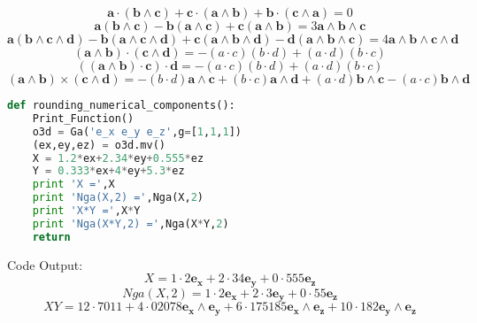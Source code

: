 \documentclass[10pt,fleqn]{report}
\newcommand{\W}{\wedge}
\begin{document}
\begin{equation*} \bm{a\cdot (b\W c)+c\cdot (a\W b)+b\cdot (c\W a)} = 0 \end{equation*}
\begin{equation*} \bm{a (b\W c)-b (a\W c)+c (a\W b)} = 3 \boldsymbol{a\wedge b\wedge c} \end{equation*}
\begin{equation*} \bm{a (b\W c\W d)-b (a\W c\W d)+c (a\W b\W d)-d (a\W b\W c)} = 4 \boldsymbol{a\wedge b\wedge c\wedge d} \end{equation*}
\begin{equation*} \bm{(a\W b)\cdot (c\W d)} = - \left ( a\cdot c\right )  \left ( b\cdot d\right )  + \left ( a\cdot d\right )  \left ( b\cdot c\right ) \end{equation*}
\begin{equation*} \bm{((a\W b)\cdot c)\cdot d} = - \left ( a\cdot c\right )  \left ( b\cdot d\right )  + \left ( a\cdot d\right )  \left ( b\cdot c\right ) \end{equation*}
\begin{equation*} \bm{(a\W b)\times (c\W d)} = - \left ( b\cdot d\right )  \boldsymbol{a\wedge c} + \left ( b\cdot c\right )  \boldsymbol{a\wedge d} + \left ( a\cdot d\right )  \boldsymbol{b\wedge c} - \left ( a\cdot c\right )  \boldsymbol{b\wedge d} \end{equation*}
\begin{lstlisting}[language=Python,showspaces=false,showstringspaces=false,backgroundcolor=\color{gray},frame=single]
def rounding_numerical_components():
    Print_Function()
    o3d = Ga('e_x e_y e_z',g=[1,1,1])
    (ex,ey,ez) = o3d.mv()
    X = 1.2*ex+2.34*ey+0.555*ez
    Y = 0.333*ex+4*ey+5.3*ez
    print 'X =',X
    print 'Nga(X,2) =',Nga(X,2)
    print 'X*Y =',X*Y
    print 'Nga(X*Y,2) =',Nga(X*Y,2)
    return
\end{lstlisting}
Code Output:
\begin{equation*} X = 1 \cdot 2 \boldsymbol{e_{x}} + 2 \cdot 34 \boldsymbol{e_{y}} + 0 \cdot 555 \boldsymbol{e_{z}} \end{equation*}
\begin{equation*} Nga(X,2) = 1 \cdot 2 \boldsymbol{e_{x}} + 2 \cdot 3 \boldsymbol{e_{y}} + 0 \cdot 55 \boldsymbol{e_{z}} \end{equation*}
\begin{equation*} X Y = 12 \cdot 7011  + 4 \cdot 02078 \boldsymbol{e_{x}\wedge e_{y}} + 6 \cdot 175185 \boldsymbol{e_{x}\wedge e_{z}} + 10 \cdot 182 \boldsymbol{e_{y}\wedge e_{z}} \end{equation*}
\end{document}
